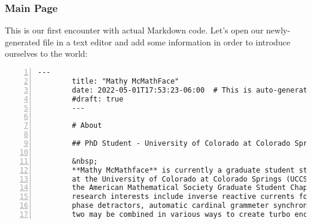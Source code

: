 \begin{frame}[fragile]
    \frametitle{Main Page}
    
    This is our first encounter with actual Markdown code. Let's open our newly-generated file
    in a text editor and add some information in order to introduce ourselves to the world:

    \vfill

    \begin{lstlisting}[style=saneCode,gobble=8,title={content/\_index.md},numbers=left]
        ---
        title: "Mathy McMathFace"
        date: 2022-05-01T17:53:23-06:00  # This is auto-generated - no need to modify this!
        #draft: true
        ---
        
        # About
        
        ## PhD Student - University of Colorado at Colorado Springs
        
        &nbsp;
        **Mathy McMathface** is currently a graduate student studying Mathematics
        at the University of Colorado at Colorado Springs (UCCS) and is an officer for
        the American Mathematical Society Graduate Student Chapter at UCCS. Their
        research interests include inverse reactive currents for use in unilateral
        phase detractors, automatic cardinal grammeter synchronization, and how these
        two may be combined in various ways to create turbo encabulators.
    \end{lstlisting}
\end{frame}
